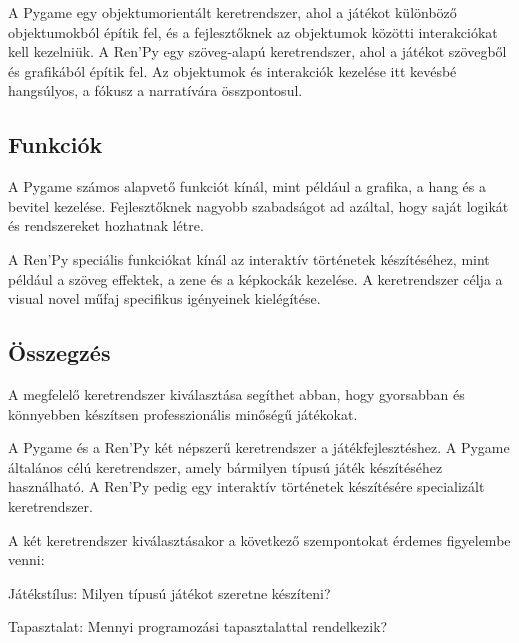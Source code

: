  A Pygame egy objektumorientált keretrendszer, ahol a játékot különböző objektumokból építik fel, és a fejlesztőknek az objektumok közötti interakciókat kell kezelniük.
A Ren'Py egy szöveg-alapú keretrendszer, ahol a játékot szövegből és grafikából építik fel. Az objektumok és interakciók kezelése itt kevésbé hangsúlyos, a fókusz a narratívára összpontosul.

\subsection{Funkciók}

 A Pygame számos alapvető funkciót kínál, mint például a grafika, a hang és a bevitel kezelése. Fejlesztőknek nagyobb szabadságot ad azáltal, hogy saját logikát és rendszereket hozhatnak létre.

A Ren'Py speciális funkciókat kínál az interaktív történetek készítéséhez, mint például a szöveg effektek, a zene és a képkockák kezelése. A keretrendszer célja a visual novel műfaj specifikus igényeinek kielégítése.

\subsection{Összegzés}
 A megfelelő keretrendszer kiválasztása segíthet abban, hogy gyorsabban és könnyebben készítsen professzionális minőségű játékokat.

A Pygame és a Ren'Py két népszerű keretrendszer a játékfejlesztéshez. A Pygame általános célú keretrendszer, amely bármilyen típusú játék készítéséhez használható. A Ren'Py pedig egy interaktív történetek készítésére specializált keretrendszer.

A két keretrendszer kiválasztásakor a következő szempontokat érdemes figyelembe venni:

Játékstílus: Milyen típusú játékot szeretne készíteni?

Tapasztalat: Mennyi programozási tapasztalattal rendelkezik?


